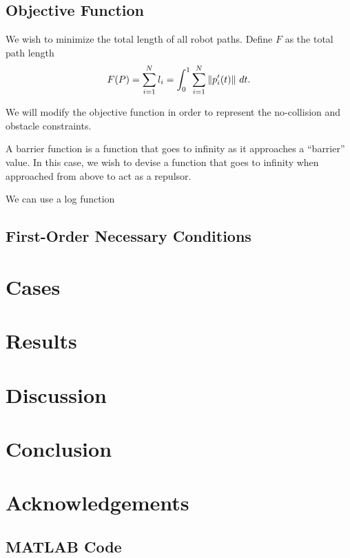 \documentclass[11pt]{article}
\begin{document}
\subsection{Objective Function}

We wish to minimize the total length of all robot paths. Define \(F\) as the total path length
\begin{equation}
	F(P) = \sum_{i=1}^{N} l_i = \int_0^1 \sum_{i=1}^{N} \left\lVert p_i'(t) \right\rVert \,dt.
\end{equation}

We will modify the objective function in order to represent the no-collision and obstacle constraints.

A barrier function is a function that goes to infinity as it approaches a ``barrier'' value. In this case, we wish to devise a function that goes to infinity when approached from above to act as a repulsor.

We can use a log function

\subsection{First-Order Necessary Conditions}

\section{Cases}

\section{Results}

\section{Discussion}

\section{Conclusion}

\section{Acknowledgements}




\begin{appendices}

\section{MATLAB Code}

\end{appendices}
\end{document}
